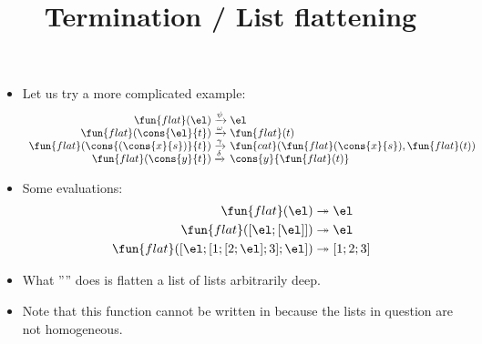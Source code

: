\documentclass[wide]{slides}
\begin{document}
\begin{slide}
  \title{Termination / List flattening}

  \begin{itemize}

    \item Let us try a more complicated example:
      \begin{equation*}
        \begin{array}{r@{\;}l@{\;}l}
          \fun{flat}(\el)                   & \xrightarrow{\psi}
          & \el\\
          \fun{flat}(\cons{\el}{t})         & \xrightarrow{\smash{\omega}}
          & \fun{flat}(t)\\
          \fun{flat}(\cons{(\cons{x}{s})}{t}) & \xrightarrow{\smash{\gamma}}
          & \fun{cat}(\fun{flat}(\cons{x}{s}),\fun{flat}(t))\\
          \fun{flat}(\cons{y}{t})           & \xrightarrow{\smash{\delta}}
          & \cons{y}{\fun{flat}(t)}
        \end{array}
      \end{equation*}

    \item Some evaluations:
      \begin{align*}
        \fun{flat}(\el) & \twoheadrightarrow \el\\
        \fun{flat}([\el;[\el]]) & \twoheadrightarrow \el\\
        \fun{flat}([\el;[1;[2;\el];3];\el]) & \twoheadrightarrow [1;2;3]
      \end{align*}

    \item What '''' does is flatten a list of lists
      arbitrarily deep.

    \item Note that this function cannot be written in \OCaml because
      the lists in question are not homogeneous.

  \end{itemize}

\end{slide}
\end{document}
